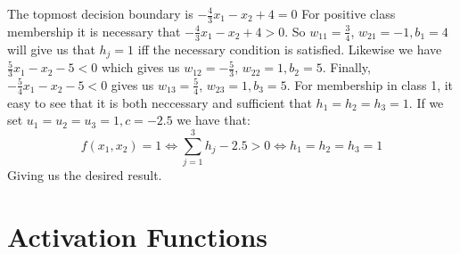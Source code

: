 \documentclass[paper=a4, fontsize=11pt]{scrartcl} %
\numberwithin{equation}{section} %
\numberwithin{figure}{section} %
\numberwithin{table}{section} %
\begin{document}
The topmost decision boundary is $-\frac{4}{3}x_1 - x_2 + 4 = 0$ For positive class membership it is necessary that $-\frac{4}{3}x_1 - x_2 + 4 > 0$. So $w_{11}=\frac{3}{4}$, $w_{21}=-1, b_1=4$ will give us that $h_j=1$ iff the necessary condition is satisfied. Likewise we have $\frac{5}{3}x_1 -x_2 -5 < 0$ which gives us $w_{12}=-\frac{5}{3}$, $w_{22}=1, b_2=5$. Finally, $-\frac{5}{4}x_1 -x_2 -5 < 0$ gives us $w_{13}=\frac{5}{4}$, $w_{23}=1, b_3=5$.
For membership in class 1, it easy to see that it is both neccessary and sufficient that $h_1 = h_2 = h_3 = 1$. If we set $u_1 = u_2 = u_3 = 1, c = -2.5$ we have that: 
$$f(x_1, x_2) = 1 \iff \sum_{j=1}^3 h_j - 2.5 > 0 \iff h_1 = h_2 = h_3 = 1$$
Giving us the desired result.

\section{Activation Functions}
\end{document}
